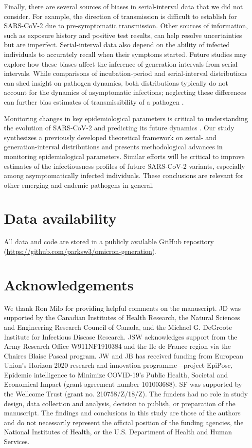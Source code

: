\documentclass[12pt]{article}
\begin{document}
Finally, there are several sources of biases in serial-interval data that we did not consider.
For example, the direction of transmission is difficult to establish for SARS-CoV-2 due to pre-symptomatic transmission.
Other sources of information, such as exposure history and positive test results, can help resolve uncertainties but are imperfect.
Serial-interval data also depend on the ability of infected individuals to accurately recall when their symptoms started.
Future studies may explore how these biases affect the inference of generation intervals from serial intervals.
While comparisons of incubation-period and serial-interval distributions can shed insight on pathogen dynamics, both distributions typically do not account for the dynamics of asymptomatic infections; neglecting these differences can further bias estimates of transmissibility of a pathogen \citep{park2020time}.

Monitoring changes in key epidemiological parameters is critical to understanding the evolution of SARS-CoV-2 and predicting its future dynamics \citep{kraemer2021monitoring}.
Our study synthesizes a previously developed theoretical framework on serial- and generation-interval distributions and presents methodological advances in monitoring epidemiological parameters.
Similar efforts will be critical to improve estimates of the infectiousness profiles of future SARS-CoV-2 variants, especially among asymptomatically infected individuals.
These conclusions are relevant for other emerging and endemic pathogens in general.

\section*{Data availability}

All data and code are stored in a publicly available GitHub repository (\url{https://github.com/parksw3/omicron-generation}).

\section*{Acknowledgements}

We thank Ron Milo for providing helpful comments on the manuscript. 
JD was supported by the Canadian Institutes of Health Research, the Natural Sciences and Engineering Research Council of Canada, and the Michael G. DeGroote Institute for Infectious Disease Research.
JSW acknowledges support from the Army Research Office W911NF1910384 and the Ile de France region via the Chaires Blaise Pascal program. 
JW and JB has received funding from European Union's Horizon 2020 research and innovation programme---project EpiPose, Epidemic intelligence to Minimize COVID-19’s Public Health, Societal and Economical Impact (grant agreement number 101003688). 
SF was supported by the Wellcome Trust (grant no. 210758/Z/18/Z). 
The funders had no role in study design, data collection and analysis, decision to publish, or preparation of the manuscript. 
The findings and conclusions in this study are those of the authors and do not necessarily represent the official position of the funding agencies, the National Institutes of Health, or the U.S. Department of Health and Human Services.
\end{document}
